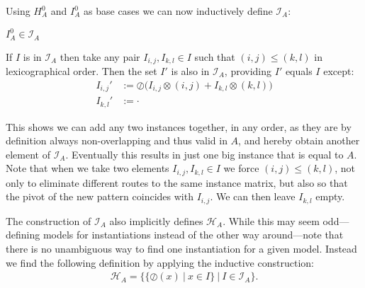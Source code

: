 \documentclass{llncs}
\begin{document}
Using $H_A^0$ and ${I}_A^0$ as base cases we can now inductively define $\mathcal{I}_A$: %
\vspace{-0.2\baselineskip}
\begin{description}[labelwidth=\widthof{\bfseries By induction}]
\item[Base case] ${I}_A^0 \in \mathcal{I}_A$
\item[By induction] If ${I}$ is in $\mathcal{I}_A$ then take any pair ${I}_{i,j},{I}_{k,l} \in {I}$ such that $(i,j)\leq(k,l)$ in lexicographical order. Then the set ${I}'$ is also in $\mathcal{I}_A$, providing ${I}'$ equals ${I}$ except:
\vspace{-1.5\baselineskip}
\begin{align*}
{I}_{i,j}' &:= \oslash \big( {I}_{i,j} \otimes (i,j) + {I}_{k,l} \otimes (k,l) \big) \\
{I}_{k,l}' &:= \cdot %
\end{align*}
\end{description}
\vspace{-0.2\baselineskip}

\noindent This shows we can add any two instances together, in any order, as they are by definition always non-overlapping and thus valid in $A$, and hereby obtain another element of $\mathcal{I}_A$. Eventually this results in just one big instance that is equal to $A$. Note that when we take two elements ${I}_{i,j},{I}_{k,l} \in {I}$ we force $(i,j)\leq(k,l)$, not only to eliminate different routes to the same instance matrix, but also so that the pivot of the new pattern coincides with ${I}_{i,j}$. We can then leave ${I}_{k,l}$ empty.

The construction of $\mathcal{I}_A$ also implicitly defines $\mathcal{H}_A$. While this may seem odd---defining models for instantiations instead of the other way around---note that there is no unambiguous way to find one instantiation for a given model. Instead we find the following definition by applying the inductive construction:
%
\begin{align}
\mathcal{H}_A=\big\{\{\oslash({x}) \ | \ {x} \in {I} \} \ \big | \ {I} \in \mathcal{I}_A \big\}.
\end{align}
\end{document}
